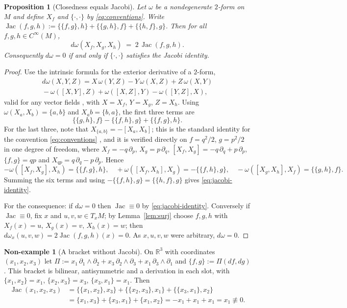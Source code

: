 \documentclass[10pt,a4paper]{article}
\theoremstyle{plain}
\newtheorem{proposition}[theorem]{Proposition}
\theoremstyle{definition}
\newtheorem{nonexample}[theorem]{Non-example}
\newcommand{\Cinf}{C^{\infty}}
\newcommand{\R}{\mathbb{R}}
\newcommand{\PB}[2]{\{#1,#2\}}
\DeclareMathOperator{\Jac}{Jac}
\begin{document}
\begin{proposition}[Closedness equals Jacobi]
\label{prop:jacobi}
Let $\omega$ be a nondegenerate $2$-form on $M$ and define $X_f$ and $\PB{\cdot}{\cdot}$ by \eqref{eq:conventions}. Write $\Jac(f,g,h) := \PB{\PB{f}{g}}{h} + \PB{\PB{g}{h}}{f} + \PB{\PB{h}{f}}{g}$. Then for all $f,g,h \in \Cinf(M)$,
\begin{equation}
\label{eq:jacobi-identity}
d\omega(X_f,X_g,X_h) \;=\; 2\,\Jac(f,g,h).
\end{equation}
Consequently $d\omega = 0$ if and only if $\PB{\cdot}{\cdot}$ satisfies the Jacobi identity.
\end{proposition}
\begin{proof}
Use the intrinsic formula for the exterior derivative of a $2$-form,
\begin{multline*}
d\omega(X,Y,Z) = X\,\omega(Y,Z) - Y\,\omega(X,Z) + Z\,\omega(X,Y)\\
{} - \omega([X,Y],Z) + \omega([X,Z],Y) - \omega([Y,Z],X),
\end{multline*}
valid for any vector fields \cite[Ch.~14]{Lee2013}, with $X = X_f$, $Y = X_g$, $Z = X_h$. Using $\omega(X_a,X_b) = \PB{a}{b}$ and $X_a b = \PB{b}{a}$, the first three terms are
\[
\PB{\PB{g}{h}}{f} - \PB{\PB{f}{h}}{g} + \PB{\PB{f}{g}}{h}.
\]
For the last three, note that $X_{\PB{a}{b}} = -[X_a,X_b]$; this is the standard identity for the convention \eqref{eq:conventions} \cite[Prop.~3.3.17]{AbrahamMarsden1978}, and it is verified directly on $f = q^2/2$, $g = p^2/2$ in one degree of freedom, where $X_f = -q\,\partial_p$, $X_g = p\,\partial_q$, $[X_f,X_g] = -q\,\partial_q + p\,\partial_p$, $\PB{f}{g} = qp$ and $X_{qp} = q\,\partial_q - p\,\partial_p$. Hence
\[
-\omega([X_f,X_g],X_h) = \PB{\PB{f}{g}}{h}, \quad
+\omega([X_f,X_h],X_g) = -\PB{\PB{f}{h}}{g}, \quad
-\omega([X_g,X_h],X_f) = \PB{\PB{g}{h}}{f}.
\]
Summing the six terms and using $-\PB{\PB{f}{h}}{g} = \PB{\PB{h}{f}}{g}$ gives \eqref{eq:jacobi-identity}.

For the consequence: if $d\omega = 0$ then $\Jac \equiv 0$ by \eqref{eq:jacobi-identity}. Conversely if $\Jac \equiv 0$, fix $x$ and $u,v,w \in T_xM$; by Lemma~\ref{lem:surj} choose $f,g,h$ with $X_f(x) = u$, $X_g(x) = v$, $X_h(x) = w$; then $d\omega_x(u,v,w) = 2\Jac(f,g,h)(x) = 0$. As $x,u,v,w$ were arbitrary, $d\omega = 0$.
\end{proof}

\begin{nonexample}[A bracket without Jacobi]
\label{nonex:jacobi}
On $\R^3$ with coordinates $(x_1,x_2,x_3)$ let $\Pi := x_1\,\partial_1\wedge\partial_2 + x_3\,\partial_2\wedge\partial_3 + x_1\,\partial_3\wedge\partial_1$ and $\PB{f}{g} := \Pi(df,dg)$. This bracket is bilinear, antisymmetric and a derivation in each slot, with $\PB{x_1}{x_2} = x_1$, $\PB{x_2}{x_3} = x_3$, $\PB{x_3}{x_1} = x_1$. Then
\begin{align*}
\Jac(x_1,x_2,x_3) &= \PB{\PB{x_1}{x_2}}{x_3} + \PB{\PB{x_2}{x_3}}{x_1} + \PB{\PB{x_3}{x_1}}{x_2}\\
&= \PB{x_1}{x_3} + \PB{x_3}{x_1} + \PB{x_1}{x_2} = -x_1 + x_1 + x_1 = x_1 \not\equiv 0 .
\end{align*}
\end{nonexample}
\end{document}
